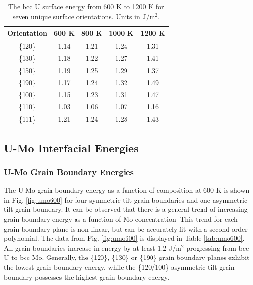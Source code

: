 \documentclass[review]{elsarticle}
\begin{document}
\begin{table}[h]
\caption{The bcc U surface energy from 600 K to 1200 K for seven unique surface orientations. Units in J/m$^{2}$. } \label{tab:usurf}
\begin{center}
\begin{tabular}{|c|c|c|c|c|}
	\hline
	Orientation & 600 K & 800 K & 1000 K & 1200 K \\
	 \hline
	 \{120\} & 1.14 & 1.21 & 1.24 & 1.31 \\
	 \{130\} & 1.18 & 1.22 & 1.27 & 1.41 \\
	 \{150\} & 1.19 & 1.25 & 1.29 & 1.37 \\
	 \{190\} & 1.17 & 1.24 & 1.32 & 1.49 \\
	 \{100\} & 1.15 & 1.23 & 1.31 & 1.47 \\
	 \{110\} & 1.03 & 1.06 & 1.07 & 1.16 \\
	 \{111\} & 1.21 & 1.24 & 1.28 & 1.43 \\	 
	 \hline
\end{tabular}
\end{center}
\label{default}
\end{table}

\FloatBarrier

\subsection{U-Mo Interfacial Energies}
\subsubsection{U-Mo Grain Boundary Energies}

The U-Mo grain boundary energy as a function of composition at 600 K is shown in Fig. \ref{fig:umo600} for four symmetric tilt grain boundaries and one asymmetric tilt grain boundary. It can be observed that there is a general trend of increasing grain boundary energy as a function of Mo concentration. This trend for each grain boundary plane is non-linear, but can be accurately fit with a second order polynomial. The data from Fig. \ref{fig:umo600} is displayed in Table \ref{tab:umo600}. All grain boundaries increase in energy by at least 1.2 J/m$^{2}$ progressing from bcc U to bcc Mo. Generally, the \{120\}, \{130\} or \{190\} grain boundary planes exhibit the lowest grain boundary energy, while the \{120/100\} asymmetric tilt grain boundary possesses the highest grain boundary energy. 
\end{document}
